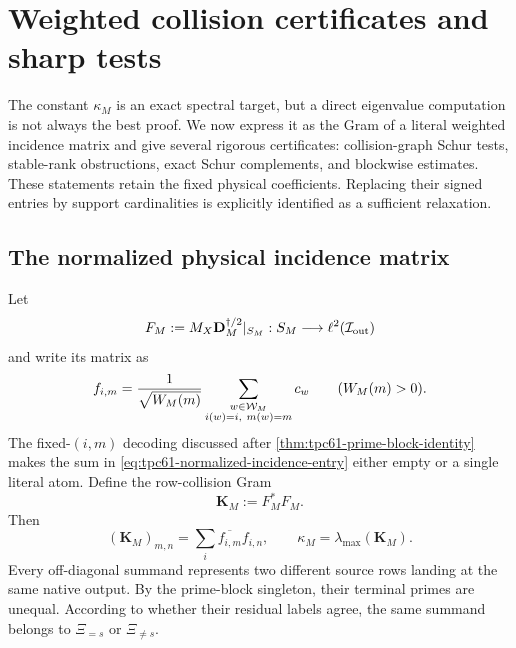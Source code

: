 \section{Weighted collision certificates and sharp tests}
\label{sec:tpc61-collision-certificates}

The constant \(\kappa_M\) is an exact spectral target, but a direct
eigenvalue computation is not always the best proof.  We now express it as
the Gram of a literal weighted incidence matrix and give several rigorous
certificates: collision-graph Schur tests, stable-rank obstructions, exact
Schur complements, and blockwise estimates.  These statements retain the
fixed physical coefficients.  Replacing their signed entries by support
cardinalities is explicitly identified as a sufficient relaxation.

\subsection{The normalized physical incidence matrix}

Let
\begin{equation}
 F_M:=M_X\mathbf D_M^{\dagger/2}|_{S_M}
 :S_M\longrightarrow\ell^2(\mathcal I_{\rm out})
 \label{eq:tpc61-normalized-incidence-map}
\end{equation}
and write its matrix as
\begin{equation}
 f_{i,m}
 =\frac{1}{\sqrt{W_M(m)}}
   \sum_{\substack{w\in\mathcal W_M\\i(w)=i,\ m(w)=m}}c_w
 \qquad(W_M(m)>0).
 \label{eq:tpc61-normalized-incidence-entry}
\end{equation}
The fixed-\((i,m)\) decoding discussed after
\cref{thm:tpc61-prime-block-identity} makes the sum in
\eqref{eq:tpc61-normalized-incidence-entry} either empty or a single
literal atom.  Define the row-collision Gram
\begin{equation}
 \mathbf K_M:=F_M^*F_M.
 \label{eq:tpc61-collision-gram}
\end{equation}
Then
\begin{equation}
 (\mathbf K_M)_{m,n}
 =\sum_i\overline{f_{i,m}}f_{i,n},
 \qquad
 \kappa_M=\lambda_{\max}(\mathbf K_M).
 \label{eq:tpc61-collision-gram-entries}
\end{equation}
Every off-diagonal summand represents two different source rows landing at
the same native output.  By the prime-block singleton, their terminal
primes are unequal.  According to whether their residual labels agree, the
same summand belongs to \(\Xi_{=s}\) or \(\Xi_{\ne s}\).

